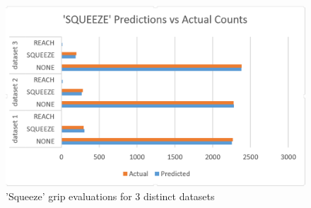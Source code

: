 \begin{figure}[h]
\includegraphics[width=.45\textwidth]{squeeze_eval.png}
\caption{'Squeeze' grip evaluations for 3 distinct datasets}
\label{fig:squeeze_eval}
\end{figure}

